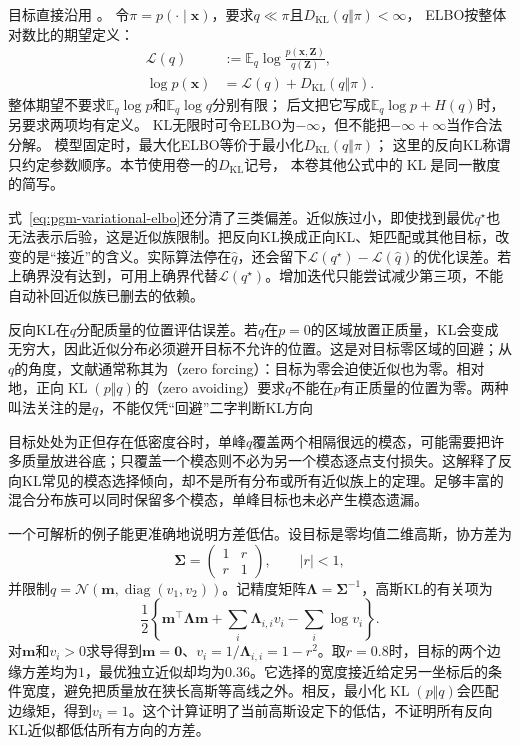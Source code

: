 目标直接沿用
。
令$\pi=p(\cdot\mid\bm x)$，要求$q\ll\pi$且$D_{\mathrm{KL}}(q\Vert\pi)<\infty$，
ELBO按整体对数比的期望定义：
\begin{equation}
  \begin{aligned}
    \mathcal L(q)
      &:=\mathbb E_q\log\frac{p(\bm x,\bm Z)}{q(\bm Z)},\\
    \log p(\bm{x})
      &=\mathcal L(q)+D_{\mathrm{KL}}(q\Vert\pi).
  \end{aligned}
  \label{eq:pgm-variational-elbo}
\end{equation}
整体期望不要求$\mathbb E_q\log p$和$\mathbb E_q\log q$分别有限；
后文把它写成$\mathbb E_q\log p+H(q)$时，另要求两项均有定义。
KL无限时可令ELBO为$-\infty$，但不能把$-\infty+\infty$当作合法分解。
模型固定时，最大化ELBO等价于最小化$D_{\mathrm{KL}}(q\Vert\pi)$；
这里的反向KL称谓只约定参数顺序。本节使用卷一的$D_{\mathrm{KL}}$记号，
本卷其他公式中的$\operatorname{KL}$是同一散度的简写。

式~\eqref{eq:pgm-variational-elbo}还分清了三类偏差。近似族过小，即使找到最优$q^\star$也无法表示后验，这是近似族限制。把反向KL换成正向KL、矩匹配或其他目标，改变的是“接近”的含义。实际算法停在$\widehat q$，还会留下$\mathcal L(q^\star)-\mathcal L(\widehat q)$的优化误差。若上确界没有达到，可用上确界代替$\mathcal L(q^\star)$。增加迭代只能尝试减少第三项，不能自动补回近似族已删去的依赖。

反向KL在$q$分配质量的位置评估误差。若$q$在$p=0$的区域放置正质量，KL会变成无穷大，因此近似分布必须避开目标不允许的位置。这是对目标零区域的回避；从$q$的角度，文献通常称其为（zero forcing）：目标为零会迫使近似也为零。相对地，正向$\operatorname{KL}(p\Vert q)$的（zero avoiding）要求$q$不能在$p$有正质量的位置为零。两种叫法关注的是$q$，不能仅凭“回避”二字判断KL方向

目标处处为正但存在低密度谷时，单峰$q$覆盖两个相隔很远的模态，可能需要把许多质量放进谷底；只覆盖一个模态则不必为另一个模态逐点支付损失。这解释了反向KL常见的模态选择倾向，却不是所有分布或所有近似族上的定理。足够丰富的混合分布族可以同时保留多个模态，单峰目标也未必产生模态遗漏。

一个可解析的例子能更准确地说明方差低估。设目标是零均值二维高斯，协方差为
\[
  \bm{\Sigma}=
  \begin{pmatrix}1&r\\r&1\end{pmatrix},
  \qquad |r|<1,
\]
并限制$q=\mathcal N(\bm{m},\operatorname{diag}(v_1,v_2))$。记精度矩阵$\bm{\Lambda}=\bm{\Sigma}^{-1}$，高斯KL的有关项为
\[
  \frac12\left\{\bm{m}^{\top}\bm{\Lambda}\bm{m}
     +\sum_i\bm{\Lambda}_{i,i}v_i-\sum_i\log v_i\right\}.
\]
对$\bm{m}$和$v_i>0$求导得到$\bm{m}=\bm{0}$、$v_i=1/\bm{\Lambda}_{i,i}=1-r^2$。取$r=0.8$时，目标的两个边缘方差均为$1$，最优独立近似却均为$0.36$。它选择的宽度接近给定另一坐标后的条件宽度，避免把质量放在狭长高斯等高线之外。相反，最小化$\operatorname{KL}(p\Vert q)$会匹配边缘矩，得到$v_i=1$。这个计算证明了当前高斯设定下的低估，不证明所有反向KL近似都低估所有方向的方差。

